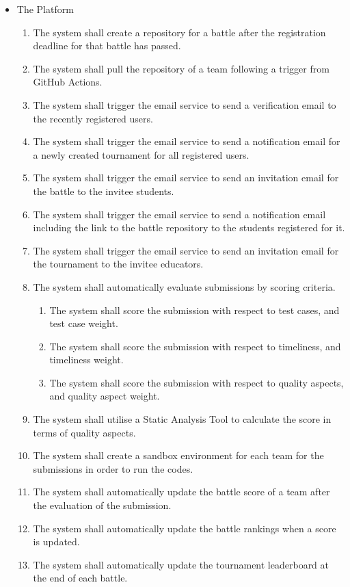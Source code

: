\begin{itemize}
 \item The Platform
  \begin{enumerate}[resume]
  \item The system shall create a repository for a battle after the registration deadline for that battle has passed.
     \item The system shall pull the repository of a team following a trigger from GitHub Actions.
     \item The system shall trigger the email service to send a verification email to the recently registered users.
    \item The system shall trigger the email service to send a notification email for a newly created tournament for all registered users.
    \item The system shall trigger the email service to send an invitation email for the battle to the invitee students.
    \item The system shall trigger the email service to send a notification email including the link to the battle repository to the students registered for it.
    \item The system shall trigger the email service to send an invitation email for the tournament to the invitee educators.
     \item The system shall automatically evaluate submissions by scoring criteria.
     \begin{enumerate}
         \item The system shall score the submission with respect to test cases, and test case weight.
         \item The system shall score the submission with respect to timeliness, and timeliness weight.
         \item The system shall score the submission with respect to quality aspects, and quality aspect weight.
     \end{enumerate}
     \item The system shall utilise a Static Analysis Tool to calculate the score in terms of quality aspects.
     \item The system shall create a sandbox environment for each team for the submissions in order to run the codes.
     \item The system shall automatically update the battle score of a team after the evaluation of the submission.
     \item The system shall automatically update the battle rankings when a score is updated.
     \item The system shall automatically update the tournament leaderboard at the end of each battle.
 \end{enumerate}
 
\end{itemize}


